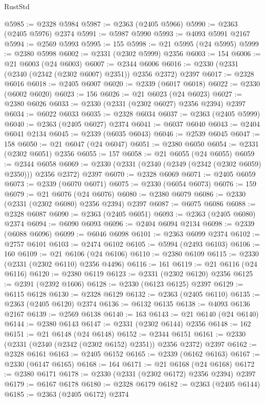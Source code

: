 \begin{lexlean}{RustStd}
\begin{coremodule}
@5985 := @2328 @5984
@5987 := @2363 (@2405 @5966)
@5990 := @2363 (@2405 @5976) @2374
@5991 := @5987 @5990
@5993 := @4093 @5991 @2167
@5994 := @2569 @5993
@5995 := 155
@5998 := @21 @5995 (@24 @5995)
@5999 := @2380 @5998
@6002 := @2331 (@2302 @5999) @2356
@6003 := 154
@6006 := @21 @6003 (@24 @6003)
@6007 := @2344 @6006
@6016 := @2330 (@2331 (@2340 (@2342 (@2302 @6007) @2351)) @2356 @2372) @2397
@6017 := @2328 @6016
@6018 := @2405 @6007
@6020 := @2339 (@6017 @6018)
@6022 := @2330 (@6002 @6020)
@6023 := 156
@6026 := @21 @6023 (@24 @6023)
@6027 := @2380 @6026
@6033 := @2330 (@2331 (@2302 @6027) @2356 @2394) @2397
@6034 := @6022 @6033
@6035 := @2328 @6034
@6037 := @2363 (@2405 @5999)
@6040 := @2363 (@2405 @6027) @2374
@6041 := @6037 @6040
@6043 := @2404 @6041 @2134
@6045 := @2339 (@6035 @6043)
@6046 := @2539 @6045
@6047 := 158
@6050 := @21 @6047 (@24 @6047)
@6051 := @2380 @6050
@6054 := @2331 (@2302 @6051) @2356
@6055 := 157
@6058 := @21 @6055 (@24 @6055)
@6059 := @2344 @6058
@6069 := @2330 (@2331 (@2340 (@2349 (@2342 (@2302 @6059) @2350))) @2356 @2372) @2397
@6070 := @2328 @6069
@6071 := @2405 @6059
@6073 := @2339 (@6070 @6071)
@6075 := @2330 (@6054 @6073)
@6076 := 159
@6079 := @21 @6076 (@24 @6076)
@6080 := @2380 @6079
@6086 := @2330 (@2331 (@2302 @6080) @2356 @2394) @2397
@6087 := @6075 @6086
@6088 := @2328 @6087
@6090 := @2363 (@2405 @6051)
@6093 := @2363 (@2405 @6080) @2374
@6094 := @6090 @6093
@6096 := @2404 @6094 @2134
@6098 := @2339 (@6088 @6096)
@6099 := @6046 @6098
@6101 := @2363 @6099 @2374
@6102 := @2757 @6101
@6103 := @2474 @6102
@6105 := @5994 (@2493 @6103)
@6106 := 160
@6109 := @21 @6106 (@24 @6106)
@6110 := @2380 @6109
@6115 := @2330 (@2331 (@2302 @6110) @2356 @4496)
@6116 := 161
@6119 := @21 @6116 (@24 @6116)
@6120 := @2380 @6119
@6123 := @2331 (@2302 @6120) @2356
@6125 := @2391 (@2392 @1606)
@6128 := @2330 (@6123 @6125) @2397
@6129 := @6115 @6128
@6130 := @2328 @6129
@6132 := @2363 (@2405 @6110)
@6135 := @2363 (@2405 @6120) @2374
@6136 := @6132 @6135
@6138 := @4093 @6136 @2167
@6139 := @2569 @6138
@6140 := 163
@6143 := @21 @6140 (@24 @6140)
@6144 := @2380 @6143
@6147 := @2331 (@2302 @6144) @2356
@6148 := 162
@6151 := @21 @6148 (@24 @6148)
@6152 := @2344 @6151
@6161 := @2330 (@2331 (@2340 (@2342 (@2302 @6152) @2351)) @2356 @2372) @2397
@6162 := @2328 @6161
@6163 := @2405 @6152
@6165 := @2339 (@6162 @6163)
@6167 := @2330 (@6147 @6165)
@6168 := 164
@6171 := @21 @6168 (@24 @6168)
@6172 := @2380 @6171
@6178 := @2330 (@2331 (@2302 @6172) @2356 @2394) @2397
@6179 := @6167 @6178
@6180 := @2328 @6179
@6182 := @2363 (@2405 @6144)
@6185 := @2363 (@2405 @6172) @2374

\end{coremodule}
\end{lexlean}
